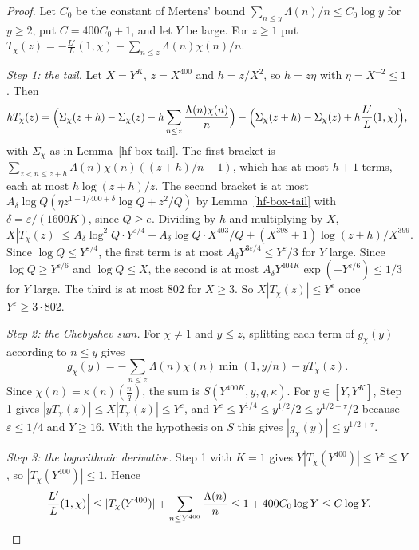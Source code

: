 \begin{proof}
Let $C_0$ be the constant of Mertens' bound $\sum_{n\leq y}\Lambda(n)/n\leq C_0\log y$ for $y\geq2$,
put $C=400C_0+1$, and let $Y$ be large. For $z\geq1$ put
$T_\chi(z)=-\frac{L'}{L}(1,\chi)-\sum_{n\leq z}\Lambda(n)\chi(n)/n$.

\emph{Step 1: the tail.} Let $X=Y^K$, $z=X^{400}$ and $h=z/X^2$, so $h=z\eta$ with
$\eta=X^{-2}\leq1$. Then
\[
 hT_\chi(z)=\Bigl(\Sigma_\chi(z+h)-\Sigma_\chi(z)-h\sum_{n\leq z}\frac{\Lambda(n)\chi(n)}n\Bigr)
 -\Bigl(\Sigma_\chi(z+h)-\Sigma_\chi(z)+h\frac{L'}{L}(1,\chi)\Bigr),
\]
with $\Sigma_\chi$ as in Lemma~\ref{hf-box-tail}. The first bracket is
$\sum_{z<n\leq z+h}\Lambda(n)\chi(n)((z+h)/n-1)$, which has at most $h+1$ terms, each at most
$h\log(z+h)/z$. The second bracket is at most
$A_\delta\log Q(\eta z^{1-1/400+\delta}\log Q+z^2/Q)$ by Lemma~\ref{hf-box-tail} with
$\delta=\varepsilon/(1600K)$, since $Q\geq e$. Dividing by $h$ and multiplying by $X$,
\[
 X|T_\chi(z)|\leq A_\delta\log^2Q\cdot Y^{\varepsilon/4}+A_\delta\log Q\cdot X^{403}/Q+(X^{398}+1)\log(z+h)/X^{399}.
\]
Since $\log Q\leq Y^{\varepsilon/4}$, the first term is at most $A_\delta Y^{3\varepsilon/4}\leq Y^\varepsilon/3$
for $Y$ large. Since $\log Q\geq Y^{\varepsilon/6}$ and $\log Q\leq X$, the second is at most
$A_\delta Y^{404K}\exp(-Y^{\varepsilon/6})\leq1/3$ for $Y$ large. The third is at most $802$ for $X\geq3$. So
$X|T_\chi(z)|\leq Y^\varepsilon$ once $Y^\varepsilon\geq3\cdot802$.

\emph{Step 2: the Chebyshev sum.} For $\chi\neq1$ and $y\leq z$, splitting each term of $g_\chi(y)$
according to $n\leq y$ gives
\[
 g_\chi(y)=-\sum_{n\leq z}\Lambda(n)\chi(n)\min(1,y/n)-yT_\chi(z).
\]
Since $\chi(n)=\kappa(n)\left(\frac nq\right)$, the sum is $S(Y^{400K},y,q,\kappa)$. For
$y\in[Y,Y^K]$, Step 1 gives $|yT_\chi(z)|\leq X|T_\chi(z)|\leq Y^\varepsilon$, and
$Y^\varepsilon\leq Y^{1/4}\leq y^{1/2}/2\leq y^{1/2+\tau}/2$ because $\varepsilon\leq1/4$ and
$Y\geq16$. With the hypothesis on $S$ this gives $|g_\chi(y)|\leq y^{1/2+\tau}$.

\emph{Step 3: the logarithmic derivative.} Step 1 with $K=1$ gives
$Y|T_\chi(Y^{400})|\leq Y^\varepsilon\leq Y$, so $|T_\chi(Y^{400})|\leq1$. Hence
\[
 \Bigl|\frac{L'}{L}(1,\chi)\Bigr|\leq|T_\chi(Y^{400})|+\sum_{n\leq Y^{400}}\frac{\Lambda(n)}n
 \leq1+400C_0\log Y\leq C\log Y.
\]
\end{proof}

